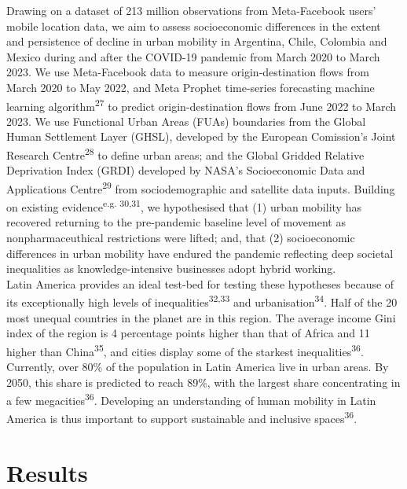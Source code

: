 \documentclass[
  11pt,
]{article}
\begin{document}
Drawing on a dataset of 213 million observations from Meta-Facebook
users' mobile location data, we aim to assess socioeconomic differences
in the extent and persistence of decline in urban mobility in Argentina,
Chile, Colombia and Mexico during and after the COVID-19 pandemic from
March 2020 to March 2023. We use Meta-Facebook data to measure
origin-destination flows from March 2020 to May 2022, and Meta Prophet
time-series forecasting machine learning algorithm\textsuperscript{27}
to predict origin-destination flows from June 2022 to March 2023. We use
Functional Urban Areas (FUAs) boundaries from the Global Human
Settlement Layer (GHSL), developed by the European Comission's Joint
Research Centre\textsuperscript{28} to define urban areas; and the
Global Gridded Relative Deprivation Index (GRDI) developed by NASA's
Socioeconomic Data and Applications Centre\textsuperscript{29} from
sociodemographic and satellite data inputs. Building on existing
evidence\textsuperscript{e.g. 30,31}, we hypothesised that (1) urban
mobility has recovered returning to the pre-pandemic baseline level of
movement as nonpharmaceuthical restrictions were lifted; and, that (2)
socioeconomic differences in urban mobility have endured the pandemic
reflecting deep societal inequalities as knowledge-intensive businesses
adopt hybrid working. \\

Latin America provides an ideal test-bed for testing these hypotheses
because of its exceptionally high levels of
inequalities\textsuperscript{32,33} and
urbanisation\textsuperscript{34}. Half of the 20 most unequal countries
in the planet are in this region. The average income Gini index of the
region is 4 percentage points higher than that of Africa and 11 higher
than China\textsuperscript{35}, and cities display some of the starkest
inequalities\textsuperscript{36}. Currently, over 80\% of the population
in Latin America live in urban areas. By 2050, this share is predicted
to reach 89\%, with the largest share concentrating in a few
megacities\textsuperscript{36}. Developing an understanding of human
mobility in Latin America is thus important to support sustainable and
inclusive spaces\textsuperscript{36}.

\section{Results}\label{sec-results}
\end{document}
